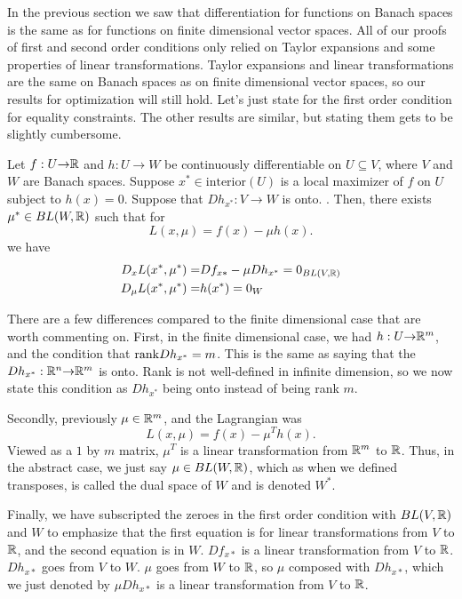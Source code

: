 In the previous section we saw that differentiation for functions on
Banach spaces is the same as for functions on finite dimensional
vector spaces. All of our proofs of first and second order conditions
only relied on Taylor expansions and some properties of linear
transformations. Taylor expansions and linear transformations are the
same on Banach spaces as on finite dimensional vector spaces, so our
results for optimization will still hold. Let's just state for the
first order condition for equality constraints. The other results are
similar, but stating them gets to be slightly cumbersome.
\begin{theorem} \label{thm:econv} Let $f:U {\rightarrow} \mathbb{R}$ and $h:U \to W$ be
  continuously differentiable on $U \subseteq V$, where 
  $V$ and $W$ are Banach spaces.  Suppose $x^* \in
  \mathrm{interior}(U)$ is a 
  local maximizer of $f$ on $U$ subject to
  $h(x) = 0$. Suppose that $Dh_{x^*}:V \to W$ is onto. 
. Then, there exists
  $\mu^* \in BL(W,\mathbb{R})$ such that for
  \[ L(x,\mu) = f(x) - \mu h(x). \]
  we have
  \begin{align*}
     D_xL(x^*,\mu^*) = & Df_{x*} - \mu Dh_{x^*} = 0_{BL(V,\mathbb{R})} \\
     D_\mu L(x^*,\mu^*) = & h(x^*) = 0_{W}
  \end{align*}
\end{theorem}
There are a few differences compared to the finite dimensional case
that are worth commenting on. First, in the finite dimensional case,
we had $h:U {\rightarrow} \mathbb{R}^m$, and the condition that $\mathrm{rank} Dh_{x^*} =
m$. This is the same as 
saying that the $Dh_{x^*}:\mathbb{R}^n {\rightarrow} \mathbb{R}^m$ is
onto. Rank is not well-defined in infinite dimension, so we now state
this condition as $Dh_{x^*}$ being onto instead of being rank
$m$. 

Secondly, previously $\mu \in \mathbb{R}^m$, and the Lagrangian was 
\[ L(x,\mu) = f(x) - \mu^T h(x). \] Viewed as a $1$ by $m$ matrix,
$\mu^T$ is a linear transformation from $\mathbb{R}^m$ to $\mathbb{R}$. Thus, in the
abstract case, we just say $\mu \in BL(W,\mathbb{R})$, which as when we defined
transposes, is called the dual space of $W$ and is denoted $W^\ast$.

Finally, we have subscripted the zeroes in the first order condition
with $BL(V,\mathbb{R})$ and $W$ to emphasize that the first equation is for
linear transformations from $V$ to $\mathbb{R}$, and the second equation is in
$W$. $Df_{x*}$ is a linear transformation from $V$ to
$\mathbb{R}$. $Dh_{x*}$ goes from $V$ to $W$. $\mu$ goes from $W$ to $\mathbb{R}$, so
$\mu$ composed with $Dh_{x*}$, which we just denoted by $\mu Dh_{x*}$
is a linear transformation from $V$ to $\mathbb{R}$.


